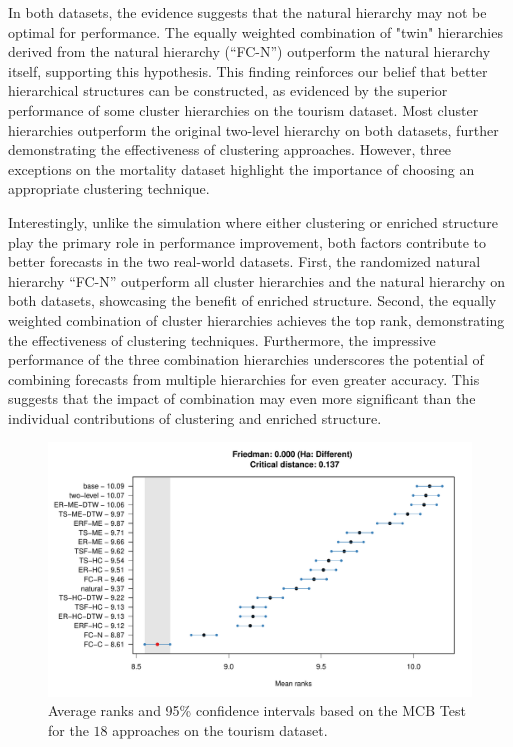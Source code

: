 \documentclass[a4paper,review,12pt,authoryear]{elsarticle}
\begin{document}
In both datasets, the evidence suggests that the natural hierarchy may not be optimal for performance. The equally weighted combination of "twin" hierarchies derived from the natural hierarchy (``FC-N'') outperform the natural hierarchy itself, supporting this hypothesis.  This finding reinforces our belief that better hierarchical structures can be constructed, as evidenced by the superior performance of some cluster hierarchies on the tourism dataset. 
Most cluster hierarchies outperform the original two-level hierarchy on both datasets, further demonstrating the effectiveness of clustering approaches. However, three exceptions on the mortality dataset highlight the importance of choosing an appropriate clustering technique.

Interestingly, unlike the simulation where either clustering or enriched structure play the primary role in performance improvement, both factors contribute to better forecasts in the two real-world datasets.  First, the randomized natural hierarchy ``FC-N'' outperform all  cluster hierarchies and the natural hierarchy on both datasets, showcasing the benefit of enriched structure. Second, the equally weighted combination of cluster hierarchies achieves the top rank, demonstrating the effectiveness of clustering techniques. 
Furthermore, the impressive performance of the three combination hierarchies underscores the potential of combining forecasts from multiple hierarchies for even greater accuracy. This suggests that the impact of combination may even more significant than the individual contributions of clustering and enriched structure.

\begin{figure}
    \centering
    \includegraphics[width=\textwidth]{figures/tourism_mcb.pdf}
    \caption{\label{fig:tourism_mcb}Average ranks and 95\% confidence intervals based on the MCB Test for the $18$ approaches on the tourism dataset.}
\end{figure}
\end{document}
